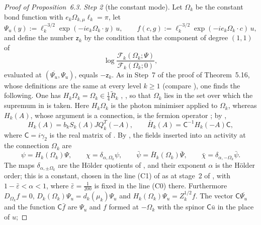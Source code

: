 \documentclass[11pt]{amsart}
\theoremstyle{definition}
\begin{document}
\begin{proof}[Proof of Proposition~6.3]
\emph{Step 2} (the constant mode).
Let $\Omega_k$ be the constant bond function with $e_k\Omega_{k,\mu}\ell_k=\pi$, let
\begin{equation*}
\Psi_u(y):=\ell_k^{-3/2}\exp(-ie_k\Omega_k\cdot y)\,u,\qquad f(c,g):=\ell_k^{-3/2}\exp(-ie_k\Omega_k\cdot c)\,u,
\end{equation*}
and define the number $\mathsf z_k$ by the condition that the component of degree $(1,1)$ of
\begin{equation*}
\log\frac{\mathscr F_k(\Omega_k;\Psi)}{\mathscr F_k(\Omega_k;0)},
\end{equation*}
evaluated at $(\overline{\Psi_u},\Psi_u)$, equals $-\mathsf z_k$.
As in Step~7 of the proof of Theorem~5.16, whose definitions \cite[(I.O8); Sections~I.3.2, I.3.3, I.3.5]{QEDIII} are the same at every level $k\ge1$ (compare \cite[Proposition~30.3\,(f)]{QEDIII}), one finds the following.
One has $H_k\Omega_k=\Omega_k\in\frac14\tilde R_k$ \cite[Propositions~5.31, 5.38\,(i)]{QEDI}, \cite[Section~I.5.7, paragraph ``Settings'']{QEDIII}, so that $\Omega_k$ lies in the set over which the supremum in \cite[(k6)]{QEDIII} is taken.
Here $H_k\Omega_k$ is the photon minimiser applied to $\Omega_k$, whereas $H_k(A)$, whose argument is a connection, is the fermion operator \cite[Section~I.5.7, first paragraph]{QEDIII};
by \cite[Section~I.3.5]{QEDIII},
\begin{equation*}
H_k(A)=b_kS_k(A)JQ_k^T(-A),\qquad\bar H_k(A)=\mathsf C^{-1}H_k(-A)\mathsf C,
\end{equation*}
where $\mathsf C=i\gamma_2$ is the real matrix of \cite[Section~I.2.1, (I.c3)]{QEDIII}.
By \cite[Section~I.5.4, paragraph ``Fields to be inserted'']{QEDIII}, the fields inserted into an activity at the connection $\Omega_k$ are
\begin{equation*}
\psi=H_k(\Omega_k)\Psi,\qquad\chi=\delta_{\alpha,\Omega_k}\psi,\qquad\bar\psi=\bar H_k(\Omega_k)\bar\Psi,\qquad\bar\chi=\delta_{\alpha,-\Omega_k}\bar\psi .
\end{equation*}
The maps $\delta_{\alpha,\pm\Omega_k}$ are the H\"older quotients of \cite[(I.1.7)]{QEDIII}, and their exponent $\alpha$ is the H\"older order;
this is a constant, chosen in the line (C1) of \cite[Section~I.8.2]{QEDIII} as at stage~2 of \cite[Definition~5.97]{QEDI}, with $1-\bar\varepsilon<\alpha<1$, where $\bar\varepsilon=\frac1{200}$ is fixed in the line (C0) there.
Furthermore $D_{\Omega_k}f=0$, $D_k(\Omega_k)\Psi_u=d_k(\mu_k)\Psi_u$ and $H_k(\Omega_k)\Psi_u=Z_k^{1/2}f$.
The vector $\mathsf C\overline{\Psi_u}$ and the function $\mathsf C\bar f$ are $\Psi_u$ and $f$ formed at $-\Omega_k$ with the spinor $\mathsf C\bar u$ in the place of $u$;

\end{proof}
\end{document}
